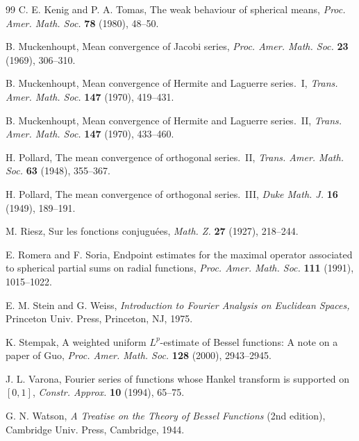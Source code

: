 \documentclass{amsart}
\theoremstyle{plain}
\begin{document}
\begin{thebibliography}{99}
 C. E. Kenig and P. A. Tomas,
{The weak behaviour of spherical means},
\textit{Proc. Amer. Math. Soc.}
\textbf{78} (1980), 48--50.

 B. Muckenhoupt,
{Mean convergence of Jacobi series},
\textit{Proc. Amer. Math. Soc.}
\textbf{23} (1969), 306--310.

 B. Muckenhoupt,
{Mean convergence of Hermite and Laguerre series.~I},
\textit{Trans. Amer. Math. Soc.}
\textbf{147} (1970), 419--431.

 B. Muckenhoupt,
{Mean convergence of Hermite and Laguerre series.~II},
\textit{Trans. Amer. Math. Soc.}
\textbf{147} (1970), 433--460.

 H. Pollard,
{The mean convergence of orthogonal series.~II},
\textit{Trans. Amer. Math. Soc.}
\textbf{63} (1948), 355--367.

 H. Pollard,
{The mean convergence of orthogonal series.~III},
\textit{Duke Math. J.}
\textbf{16} (1949), 189--191.

 M. Riesz,
{Sur les fonctions conjugu\'ees},
\textit{Math. Z.}
\textbf{27} (1927), 218--244.

 E. Romera and F. Soria,
{Endpoint estimates for the maximal operator associated to
spherical partial sums on radial functions},
\textit{Proc. Amer. Math. Soc.}
\textbf{111} (1991), 1015--1022.

 E. M. Stein and G. Weiss,
{\it Introduction to Fourier Analysis on Euclidean Spaces,}
Princeton Univ. Press, Princeton, NJ, 1975.

 K. Stempak,
{A weighted uniform $L^p$-estimate of Bessel functions:
A note on a paper of Guo},
\textit{Proc. Amer. Math. Soc.}
\textbf{128} (2000), 2943--2945.

 J. L. Varona,
{Fourier series of functions whose Hankel transform is supported on $[0,1]$},
\textit{Constr. Approx.}
\textbf{10} (1994), 65--75.

 G. N. Watson,
{\it A Treatise on the Theory of Bessel Functions} (2nd edition),
Cambridge Univ. Press,
Cambridge, 1944.

\end{thebibliography}
\end{document}
